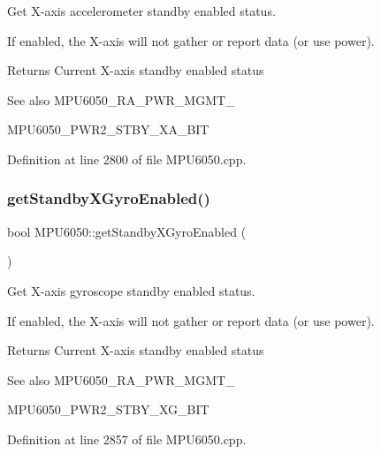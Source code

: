 Get X-\/axis accelerometer standby enabled status. 

If enabled, the X-\/axis will not gather or report data (or use power). \begin{DoxyReturn}{Returns}
Current X-\/axis standby enabled status 
\end{DoxyReturn}
\begin{DoxySeeAlso}{See also}
M\+P\+U6050\+\_\+\+R\+A\+\_\+\+P\+W\+R\+\_\+\+M\+G\+M\+T\+\_ 

M\+P\+U6050\+\_\+\+P\+W\+R2\+\_\+\+S\+T\+B\+Y\+\_\+\+X\+A\+\_\+\+B\+IT 
\end{DoxySeeAlso}


Definition at line 2800 of file M\+P\+U6050.\+cpp.

\mbox{\label{classMPU6050_acb5fde4167aa54fbbe84706d577a48a6}} 
\subsubsection{\texorpdfstring{getStandbyXGyroEnabled()}{getStandbyXGyroEnabled()}}
{\footnotesize\ttfamily bool M\+P\+U6050\+::get\+Standby\+X\+Gyro\+Enabled (\begin{DoxyParamCaption}{ }\end{DoxyParamCaption})}



Get X-\/axis gyroscope standby enabled status. 

If enabled, the X-\/axis will not gather or report data (or use power). \begin{DoxyReturn}{Returns}
Current X-\/axis standby enabled status 
\end{DoxyReturn}
\begin{DoxySeeAlso}{See also}
M\+P\+U6050\+\_\+\+R\+A\+\_\+\+P\+W\+R\+\_\+\+M\+G\+M\+T\+\_ 

M\+P\+U6050\+\_\+\+P\+W\+R2\+\_\+\+S\+T\+B\+Y\+\_\+\+X\+G\+\_\+\+B\+IT 
\end{DoxySeeAlso}


Definition at line 2857 of file M\+P\+U6050.\+cpp.

\mbox{\label{classMPU6050_a104f2ec438d745f8fdeec202bae09b48}} 
